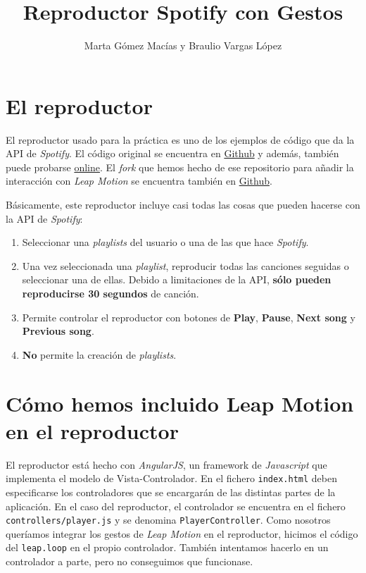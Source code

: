 \documentclass[10pt,a4paper,spanish]{article}
\title{\bf \textcolor{verde}{Reproductor Spotify con Gestos}}
\author{Marta Gómez Macías y Braulio Vargas López}
\begin{document}
\maketitle

\tableofcontents

\section{\textcolor{verde}El reproductor}
El reproductor usado para la práctica es uno de los ejemplos de código que da la API de \textit{\textcolor{verde}{Spotify}}. El código original se encuentra en \href{https://github.com/possan/webapi-player-example}{Github} y además, también puede probarse \href{http://lab.possan.se/thirtify/#/}{online}. El \textit{\textcolor{verde}{fork}} que hemos hecho de ese repositorio para añadir la interacción con \textit{\textcolor{verde}{Leap Motion}} se encuentra también en \href{https://github.com/BraulioV/webapi-player-example}{Github}.

Básicamente, este reproductor incluye casi todas las cosas que pueden hacerse con la API de \textit{\textcolor{verde}{Spotify}}:

\begin{enumerate}[\qquad \color{verde}{$\bullet$}]
  \item Seleccionar una \textit{\textcolor{verde}{playlists}} del usuario o una de las que hace \textit{\textcolor{verde}{Spotify}}.
  \item Una vez seleccionada una \textit{\textcolor{verde}{playlist}}, reproducir todas las canciones seguidas o seleccionar una de ellas. Debido a limitaciones de la API, \textcolor{verde}{\textbf{sólo pueden reproducirse 30 segundos}} de canción.
  \item Permite controlar el reproductor con botones de \textbf{\textcolor{verde}{Play}}, \textbf{\textcolor{verde}{Pause}}, \textbf{\textcolor{verde}{Next song}} y \textbf{\textcolor{verde}{Previous song}}.
  \item \textbf{\textcolor{verde}{No}} permite la creación de \textit{\textcolor{verde}{playlists}}.
\end{enumerate}

\section{\textcolor{verde}Cómo hemos incluido Leap Motion en el reproductor}
El reproductor está hecho con \textit{\textcolor{verde}{AngularJS}}, un framework de \textit{\textcolor{verde}{Javascript}} que implementa el modelo de Vista-Controlador. En el fichero \texttt{index.html} deben especificarse los controladores que se encargarán de las distintas partes de la aplicación. En el caso del reproductor, el controlador se encuentra en el fichero \texttt{controllers/player.js} y se denomina \texttt{PlayerController}. Como nosotros queríamos integrar los gestos de \textit{\textcolor{verde}{Leap Motion}} en el reproductor, hicimos el código del \texttt{leap.loop} en el propio controlador. También intentamos hacerlo en un controlador a parte, pero no conseguimos que funcionase.
\end{document}
